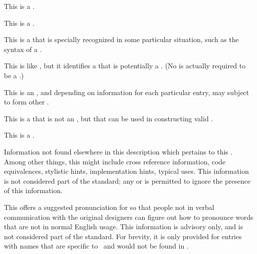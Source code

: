 
This is a .


This is a .


This is a  that is specially recognized in some particular situation,
such as the syntax of a .


This is like , but it identifies a  that is potentially
a .  (No  is actually required to be a
.)


This is an ,
and depending on information for each particular entry,
may subject to form other .


This is a  that is not an ,
but that can be used in constructing valid .


This is a .

\endlist

\endsubsubsection%


Information not found elsewhere in this description
which pertains to this .
Among other things, this might include 
 cross reference information,
 code equivalences, 
 stylistic hints,
 implementation hints,
 typical uses.
This information is not considered part of the standard;
any  or 
is permitted to ignore the presence of this information.

\endsubsubsection%


This offers a suggested pronunciation for  
so that people not in verbal communication with the original designers
can figure out how to pronounce words that are not in normal English usage.
This information is advisory only, and is not considered part of the standard.
For brevity, it is only provided for entries with names that are specific to
\clisp\ and would not be found in {\WebstersDictionary}.


